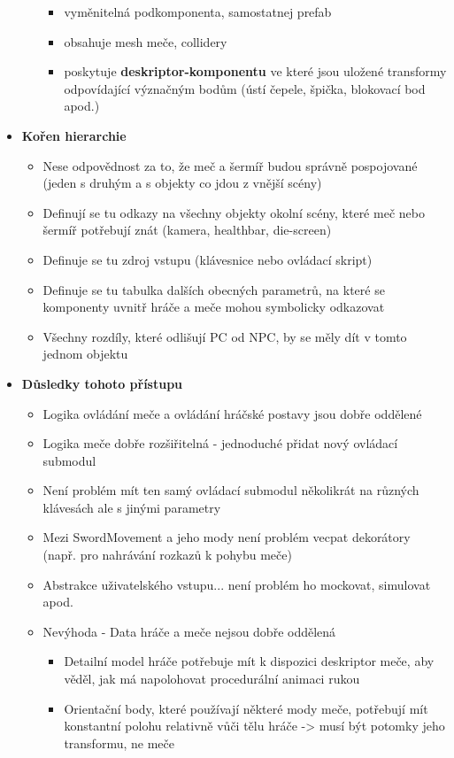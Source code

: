 \begin{itemize}
\begin{itemize}
                \begin{itemize}
                    \item vyměnitelná podkomponenta, samostatnej prefab
                    \item obsahuje mesh meče, collidery
                    \item poskytuje \textbf{deskriptor-komponentu} ve které jsou uložené transformy odpovídající význačným bodům (ústí čepele, špička, blokovací bod apod.)
                \end{itemize}
        \end{itemize} 
    \item \textbf{Kořen hierarchie} 
        \begin{itemize}
            \item Nese odpovědnost za to, že meč a šermíř budou správně pospojované (jeden s druhým a s objekty co jdou z vnější scény)
            \item Definují se tu odkazy na všechny objekty okolní scény, které meč nebo šermíř potřebují znát (kamera, healthbar, die-screen)
            \item Definuje se tu zdroj vstupu (klávesnice nebo ovládací skript)
            \item Definuje se tu tabulka dalších obecných parametrů, na které se komponenty uvnitř hráče a meče mohou symbolicky odkazovat
            \item Všechny rozdíly, které odlišují \acs{PC} od \acs{NPC}, by se měly dít v tomto jednom objektu
        \end{itemize} 
    \item \textbf{Důsledky tohoto přístupu} 
        \begin{itemize}
            \item Logika ovládání meče a ovládání hráčské postavy jsou dobře oddělené
            \item Logika meče dobře rozšiřitelná - jednoduché přidat nový ovládací submodul
            \item Není problém mít ten samý ovládací submodul několikrát na různých klávesách ale s jinými parametry
            \item Mezi SwordMovement a jeho mody není problém vecpat dekorátory (např. pro nahrávání rozkazů k pohybu meče)
            \item Abstrakce uživatelského vstupu... není problém ho mockovat, simulovat apod.
            \item Nevýhoda - Data hráče a meče nejsou dobře oddělená
                \begin{itemize}
                    \item Detailní model hráče potřebuje mít k dispozici deskriptor meče, aby věděl, jak má napolohovat procedurální animaci rukou
                    \item Orientační body, které používají některé mody meče, potřebují mít konstantní polohu relativně vůči tělu hráče -> musí být potomky jeho transformu, ne meče
                \end{itemize}
        \end{itemize} 
\end{itemize}

